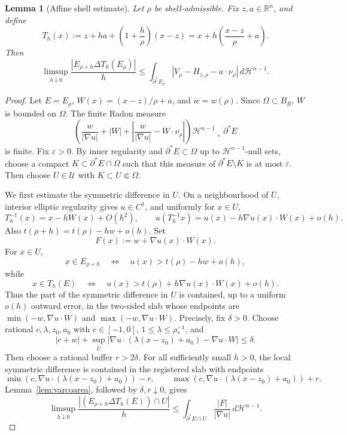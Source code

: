 \documentclass[11pt]{amsart}
\newtheorem{lemma}[theorem]{Lemma}
\theoremstyle{definition}
\newcommand{\R}{\mathbb R}
\newcommand{\Om}{\Omega}
\newcommand{\rstar}{\rho_*}
\newcommand{\wt}{w}
\newcommand{\eps}{\varepsilon}
\newcommand{\Hn}{\mathcal H^{n-1}}
\begin{document}
\begin{lemma}[Affine shell estimate]\label{lem:shell}
Let \(\rho\) be shell-admissible.  Fix \(z,a\in\R^n\), and define
\[
   T_h(x):=z+ha+\left(1+\frac h\rho\right)(x-z)
   =x+h\left(\frac{x-z}{\rho}+a\right).
\]
Then
\begin{equation}\label{eq:shell}
   \limsup_{h\downarrow0}
   \frac{|E_{\rho+h}\Delta T_h(E_\rho)|}{h}
   \le
   \int_{\partial^*E_\rho}
      |V_\rho-H_{z,\rho}-a\cdot\nu_\rho|\,d\Hn .
\end{equation}
\end{lemma}

\begin{proof}
Let \(E=E_\rho\), \(W(x)=(x-z)/\rho+a\), and \(w=\wt(\rho)\).  Since
\(\Om\subset B_R\), \(W\) is bounded on \(\Om\).  The finite Radon measure
\[
   \left(
      \frac{w}{|\nabla u|}+|W|
      +\left|\frac{w}{|\nabla u|}-W\cdot\nu_\rho\right|
   \right)\Hn\llcorner\partial^*E
\]
is finite.  Fix \(\eps>0\).  By inner regularity and
\(\partial^*E\subset\Om\) up to \(\Hn\)-null sets, choose a compact
\(K\subset\partial^*E\cap\Om\) such that this measure of
\(\partial^*E\setminus K\) is at most \(\eps\).  Then choose
\(U\in\mathcal U\) with \(K\subset U\Subset\Om\).

We first estimate the symmetric difference in \(U\).  On a neighbourhood of
\(\overline U\), interior elliptic regularity gives \(u\in C^1\), and
uniformly for \(x\in U\),
\[
   T_h^{-1}(x)=x-hW(x)+O(h^2),\qquad
   u(T_h^{-1}x)=u(x)-h\nabla u(x)\cdot W(x)+o(h).
\]
Also \(t(\rho+h)=t(\rho)-hw+o(h)\).  Set
\[
   F(x):=w+\nabla u(x)\cdot W(x).
\]
For \(x\in U\),
\[
   x\in E_{\rho+h}
   \quad\Longleftrightarrow\quad u(x)>t(\rho)-hw+o(h),
\]
while
\[
   x\in T_h(E)
   \quad\Longleftrightarrow\quad u(x)>t(\rho)+h\nabla u(x)\cdot W(x)+o(h).
\]
Thus the part of the symmetric difference in \(U\) is contained, up to a
uniform \(o(h)\) outward error, in the two-sided slab whose endpoints are
\(\min(-w,\nabla u\cdot W)\) and \(\max(-w,\nabla u\cdot W)\).
Precisely, fix \(\delta>0\).  Choose rational
\(c,\lambda,z_0,a_0\) with \(c\in[-1,0]\), \(1\le\lambda\le\rstar^{-1}\),
and
\[
   |c+w|+
   \sup_{\overline U}
   |\nabla u\cdot(\lambda(x-z_0)+a_0)-\nabla u\cdot W|
   \le\delta .
\]
Then choose a rational buffer \(r>2\delta\).  For all sufficiently small
\(h>0\), the local symmetric difference is contained in the registered slab
with endpoints
\[
   \min(c,\nabla u\cdot(\lambda(x-z_0)+a_0))-r,\qquad
   \max(c,\nabla u\cdot(\lambda(x-z_0)+a_0))+r .
\]
Lemma~\ref{lem:varcoarea}, followed by \(\delta,r\downarrow0\), gives
\[
   \limsup_{h\downarrow0}\frac{|(E_{\rho+h}\Delta T_h(E))\cap U|}{h}
   \le
   \int_{\partial^*E\cap U}\frac{|F|}{|\nabla u|}\,d\Hn .
\]


\end{proof}
\end{document}
